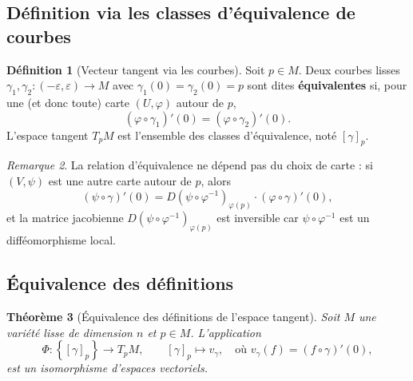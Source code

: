 \documentclass[12pt,a4paper,openany]{book}
\theoremstyle{definition}
\newtheorem{definition}{Définition}[chapter]
\theoremstyle{plain}
\newtheorem{theoreme}[definition]{Théorème}
\theoremstyle{remark}
\newtheorem{remarque}[definition]{Remarque}
\newcommand{\set}[1]{\left\{#1\right\}}
\begin{document}
\subsection{Définition via les classes d'équivalence de courbes}\label{subsec:tangent-courbes}

\begin{definition}[Vecteur tangent via les courbes]\label{def:tangent-courbe}
Soit $p \in M$. Deux courbes lisses $\gamma_1, \gamma_2 : (-\varepsilon, \varepsilon) \to M$
avec $\gamma_1(0) = \gamma_2(0) = p$ sont dites \textbf{équivalentes}
si, pour une (et donc toute) carte $(U, \varphi)$ autour de $p$,
\[
  (\varphi \circ \gamma_1)'(0) = (\varphi \circ \gamma_2)'(0).
\]
L'espace tangent $T_pM$ est l'ensemble des classes d'équivalence, noté $[\gamma]_p$.
\end{definition}

\begin{remarque}\label{rem:independance-carte-courbe}
La relation d'équivalence ne dépend pas du choix de carte : si $(V, \psi)$
est une autre carte autour de $p$, alors
\[
  (\psi \circ \gamma)'(0) = D(\psi \circ \varphi^{-1})_{\varphi(p)} \cdot (\varphi \circ \gamma)'(0),
\]
et la matrice jacobienne $D(\psi \circ \varphi^{-1})_{\varphi(p)}$ est inversible
car $\psi \circ \varphi^{-1}$ est un difféomorphisme local.
\end{remarque}

\subsection{Équivalence des définitions}\label{subsec:equivalence-tangent}

\begin{theoreme}[Équivalence des définitions de l'espace tangent]\label{thm:equiv-tangent}
Soit $M$ une variété lisse de dimension $n$ et $p \in M$.
L'application
\[
  \Phi : \set{[\gamma]_p} \longrightarrow T_pM, \qquad
  [\gamma]_p \longmapsto v_\gamma,
  \quad \text{où } v_\gamma(f) = (f \circ \gamma)'(0),
\]
est un isomorphisme d'espaces vectoriels.
\end{theoreme}
\end{document}
